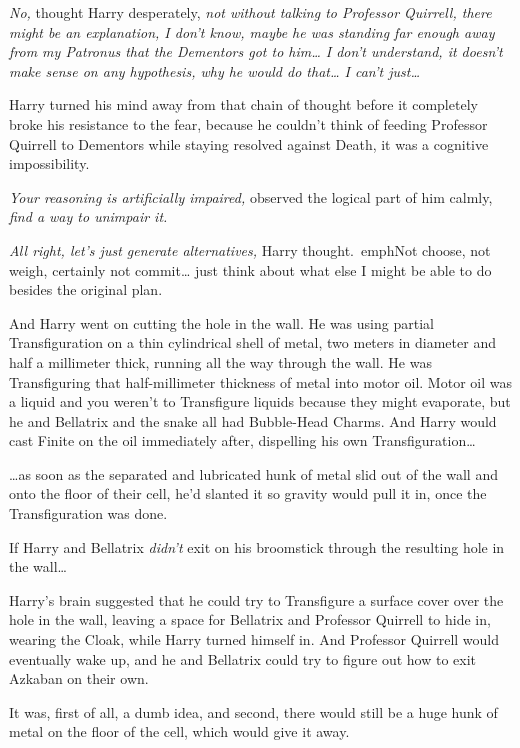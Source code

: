 \emph{No,} thought Harry desperately, \emph{not without talking to Professor 
Quirrell, there might be an explanation, I don't know, maybe he was standing 
far enough away from my Patronus that the Dementors got to him{\ldots} I don't 
understand, it doesn't make sense on any hypothesis, why he would do 
that{\ldots} I can't just{\ldots}\\
}

Harry turned his mind away from that chain of thought before it completely 
broke his resistance to the fear, because he couldn't think of feeding 
Professor Quirrell to Dementors while staying resolved against Death, it was a 
cognitive impossibility.

\emph{Your reasoning is artificially impaired,} observed the logical part of 
him calmly, \emph{find a way to unimpair it.}

\emph{All right, let's just generate alternatives,} Harry thought.\ emph{Not 
choose, not weigh, certainly not commit{\ldots} just think about what else I 
might be able to do besides the original plan.}

And Harry went on cutting the hole in the wall. He was using partial 
Transfiguration on a thin cylindrical shell of metal, two meters in diameter 
and half a millimeter thick, running all the way through the wall. He was 
Transfiguring that half-millimeter thickness of metal into motor oil. Motor oil 
was a liquid and you weren't to Transfigure liquids because they might 
evaporate, but he and Bellatrix and the snake all had Bubble-Head Charms. And 
Harry would cast Finite on the oil immediately after, dispelling his own 
Transfiguration{\ldots}

{\ldots}as soon as the separated and lubricated hunk of metal slid out of the 
wall and onto the floor of their cell, he'd slanted it so gravity would pull it 
in, once the Transfiguration was done.

If Harry and Bellatrix \emph{didn't} exit on his broomstick through the 
resulting hole in the wall{\ldots}

Harry's brain suggested that he could try to Transfigure a surface cover over 
the hole in the wall, leaving a space for Bellatrix and Professor Quirrell to 
hide in, wearing the Cloak, while Harry turned himself in. And Professor 
Quirrell would eventually wake up, and he and Bellatrix could try to figure out 
how to exit Azkaban on their own.

It was, first of all, a dumb idea, and second, there would still be a huge hunk 
of metal on the floor of the cell, which would give it away.

